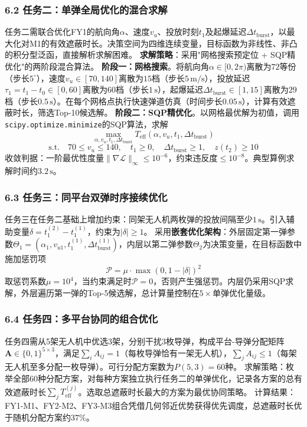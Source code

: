 \documentclass{JXUSTmodeling}
\begin{document}
\subsubsection{6.2 任务二：单弹全局优化的混合求解}
任务二需联合优化FY1的航向角$\alpha$、速度$v_u$、投放时刻$t_1$及起爆延迟$\Delta t_{\text{burst}}$，以最大化对M1的有效遮蔽时长。决策空间为四维连续变量，目标函数为非线性、非凸的积分型泛函，直接解析求解困难。
\textbf{求解策略}：采用"网格搜索预定位 + SQP精优化"的两阶段混合算法。
\textbf{阶段一：网格搜索}。将航向角$\alpha\in[0,2\pi)$离散为$72$等份（步长$5^\circ$），速度$v_u\in[70,140]$离散为$15$档（步长$5\,\mathrm{m/s}$），投放延迟$\tau_1=t_1-t_0\in[0,60]$离散为$60$档（步长$1\,\mathrm{s}$），起爆延迟$\Delta t_{\text{burst}}\in[1,15]$离散为$29$档（步长$0.5\,\mathrm{s}$）。在每个网格点执行快速弹道仿真（时间步长$0.05\,\mathrm{s}$），计算有效遮蔽时长，筛选Top-10候选解。
\textbf{阶段二：SQP精优化}。以网格最优解为初值，调用\texttt{scipy.optimize.minimize}的SQP算法，求解
$$\max_{\alpha,v_u,t_1,\Delta t_{\text{burst}}} T_{\text{eff}}(\alpha,v_u,t_1,\Delta t_{\text{burst}})$$
$$\text{s.t.}\quad 70\leq v_u\leq140,\quad t_1\geq0,\quad \Delta t_{\text{burst}}\geq1,\quad z(t_2)\geq10$$
收敛判据：一阶最优性度量$\|\nabla\mathcal{L}\|_\infty\leq10^{-6}$，约束违反度$\leq10^{-8}$。典型算例求解时间约$3.2\,\mathrm{s}$。
\subsubsection{6.3 任务三：同平台双弹时序接续优化}
任务三在任务二基础上增加约束：同架无人机两枚弹的投放间隔至少$1\,\mathrm{s}$。引入辅助变量$\delta=t_1^{(2)}-t_1^{(1)}$，约束为$|\delta|\geq1$。
采用\textbf{嵌套优化架构}：外层固定第一弹参数$\Theta_1=(\alpha_1,v_{u1},t_1^{(1)},\Delta t_{\text{burst}}^{(1)})$，内层以第二弹参数$\Theta_2$为决策变量，在目标函数中施加惩罚项
$$\mathcal{P}=\mu\cdot\max(0,1-|\delta|)^2$$
取惩罚系数$\mu=10^4$，当约束满足时$\mathcal{P}=0$，否则产生强惩罚。内层仍采用SQP求解，外层遍历第一弹的Top-5候选解，总计算量控制在$5\times$单弹优化量级。
\subsubsection{6.4 任务四：多平台协同的组合优化}
任务四需从5架无人机中优选3架，分别干扰3枚导弹，构成平台-导弹分配矩阵$\mathbf{A}\in\{0,1\}^{5\times3}$，满足$\sum_i A_{ij}=1$（每枚导弹恰有一架无人机），$\sum_j A_{ij}\leq1$（每架无人机至多分配一枚导弹）。可行分配方案数为$P(5,3)=60$种。
求解策略：枚举全部60种分配方案，对每种方案独立执行任务二的单弹优化，记录各方案的总有效遮蔽时长$\sum_j T_{\text{eff}}^{(j)}$。选取总遮蔽时长最大的方案为最优协同策略。
计算结果：FY1-M1、FY2-M2、FY3-M3组合凭借几何邻近优势获得优先调度，总遮蔽时长优于随机分配方案约$37\%$。
\end{document}
